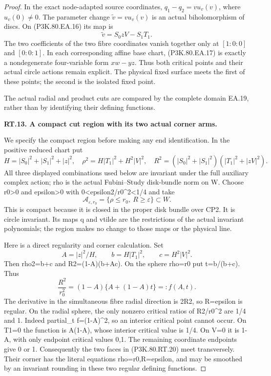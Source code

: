 \begin{proof}
In the exact node-adapted source coordinates, \(q_1-q_2=v u_v(v)\),
where \(u_v(0)\ne0\). The parameter change
\(\widetilde v=v u_v(v)\) is an actual biholomorphism of discs.
On (P3K.80.EA.16) its map is
\[
                    \widetilde v=S_0zV-S_1T_1.
 \tag{P3K.80.EA.17}
\]
The two coefficients of the two fibre coordinates vanish together only
at \([1:0:0]\) and \([0:0:1]\). In each corresponding affine base
chart, (P3K.80.EA.17) is exactly a nondegenerate four-variable form
\(xw-yz\). Thus both critical points and their actual circle actions
remain explicit. The physical fixed surface meets the first of these
points; the second is the isolated fixed point.


The actual radial and product cuts are compared by the complete domain EA.19, rather than by identifying their defining functions.


\par\medskip\noindent\textbf{RT.13. A compact cut region with its two actual corner arms.}\par\nopagebreak[4]

We specify the compact region before making any end identification.
In the positive reduced chart put
\[
 H=|S_0|^2+|S_1|^2+|z|^2,\quad
 \rho^2=H|T_1|^2+H^2|V|^2,\quad
 R^2=(|S_0|^2+|S_1|^2)(|T_1|^2+|zV|^2).
                                                        \tag{P3K.80.RT.19}
\]
All three displayed combinations used below are invariant under
the full auxiliary complex action; rho is the actual Fubini--Study
disk-bundle norm on W. Choose r0>0 and epsilon>0 with
0<epsilon2/r0\textasciicircum{}2<1/4 and take
\[
       \mathcal A_{\varepsilon,r_0}
       =\{\rho\le r_0,\ R\ge\varepsilon\}\subset W.   \tag{P3K.80.RT.20}
\]
This is compact because it is closed in the proper disk bundle over
CP2. It is circle invariant. Its maps q and vtilde are the restrictions
of the actual invariant polynomials; the region makes no change to
those maps or the physical line.

Here is a direct regularity and corner calculation. Set
\[
 A=|z|^2/H,\qquad b=H|T_1|^2,\qquad c=H^2|V|^2.
\]
Then rho2=b+c and R2=(1-A)(b+Ac). On the sphere rho=r0 put
t=b/(b+c). Thus
\[
 \frac{R^2}{r_0^2}=(1-A)\{A+(1-A)t\}=:f(A,t).       \tag{P3K.80.RT.21}
\]
The derivative in the simultaneous fibre radial direction is
2R2, so R=epsilon is regular. On the radial sphere, the only
nonzero critical ratios of R2/r0\textasciicircum{}2 are 1/4 and 1. Indeed
partial\_t f=(1-A)\textasciicircum{}2, so an interior critical point cannot occur.
On T1=0 the function is A(1-A), whose interior critical value is
1/4. On V=0 it is 1-A, with only endpoint critical values 0,1.
The remaining coordinate endpoints give 0 or 1. Consequently the
two faces in (P3K.80.RT.20) meet transversely. Their corner has the literal
equations rho=r0,R=epsilon, and may be smoothed by an invariant
rounding in these two regular defining functions.


\end{proof}
